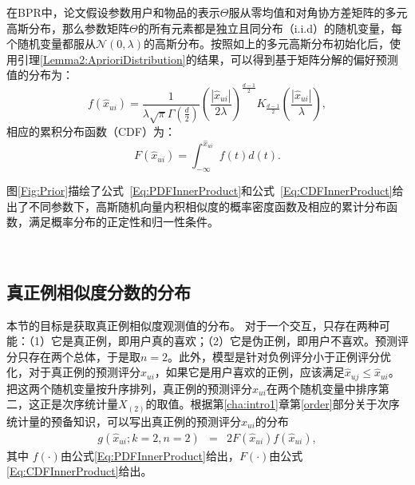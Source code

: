 在BPR中，论文假设参数用户和物品的表示$\Theta$服从零均值和对角协方差矩阵的多元高斯分布，那么参数矩阵$\Theta$的所有元素都是独立且同分布（i.i.d）的随机变量，每个随机变量都服从$\mathcal{N}(0, \lambda)$的高斯分布。按照如上的多元高斯分布初始化后，使用引理\ref{Lemma2:AprioriDistribution}的结果，可以得到基于矩阵分解的偏好预测值的分布为：
\begin{equation}\label{Eq:PDFInnerProduct}
	f(\hat{x}_{ui}) = \frac{1}{\lambda \sqrt{\pi} \Gamma(\frac{d}{2})}\left(\frac{|\hat{x}_{ui}|}{2\lambda} \right)^{\frac{d-1}{2}}K_{\frac{d-1}{2}}\left(\frac{|\hat{x}_{ui}|}{\lambda}\right),
\end{equation}
相应的累积分布函数（CDF）为：
\begin{equation}\label{Eq:CDFInnerProduct}
	F(\hat{x}_{ui}) = \int_{-\infty}^{\hat{x}_{ui}} f(t)d(t).
\end{equation}

图\ref{Fig:Prior}描绘了公式~\eqref{Eq:PDFInnerProduct}和公式~\eqref{Eq:CDFInnerProduct}给出了不同参数下，高斯随机向量内积相似度的概率密度函数及相应的累计分布函数，满足概率分布的正定性和归一性条件。
\begin{figure*}[h!]
	\centering
	\\
	\caption{不同参数下先验分布的概率密度及累积分布函数示意图}
	\label{Fig:Prior}
\end{figure*}

\subsection{真正例相似度分数的分布}\label{Sec:Posterior}
本节的目标是获取真正例相似度观测值的分布。
对于一个交互，只存在两种可能：（1）它是真正例，即用户真的喜欢；（2）它是伪正例，即用户不喜欢。预测评分只存在两个总体，于是取$n=2$。此外，模型是针对负例评分小于正例评分优化，对于真正例的预测评分$\hat{x}_{ui}$，如果它是用户喜欢的正例，应该满足$\hat{x}_{uj}\leq \hat{x}_{ui}$。把这两个随机变量按升序排列，真正例的预测评分$\hat{x}_{ui}$在两个随机变量中排序第二，这正是次序统计量$X_{(2)}$的取值。根据第\ref{cha:intro1}章第\ref{order}部分关于次序统计量的预备知识，可以写出真正例的预测评分$\hat{x}_{ui}$的分布
\begin{eqnarray}\label{Eq:ConditionalDistribution}
	g(\hat{x}_{ui};k=2,n=2)
	& = & 2 F(\hat{x}_{ui})f(\hat{x}_{ui}),
\end{eqnarray}
其中 $f(\cdot)$由公式\ref{Eq:PDFInnerProduct}给出，$F(\cdot)$由公式\ref{Eq:CDFInnerProduct}给出。

